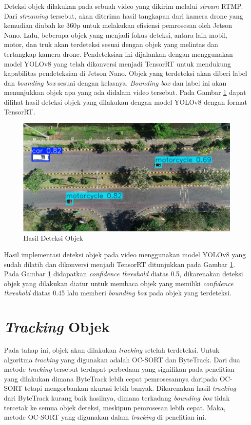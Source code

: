 Deteksi objek dilakukan pada sebuah video yang dikirim melalui \emph{stream} RTMP. Dari \emph{streaming} tersebut, akan diterima hasil tangkapan dari kamera drone yang kemudian diubah ke 360p untuk melakukan efisiensi pemrosesan oleh Jetson Nano. Lalu, beberapa objek yang menjadi fokus deteksi, antara lain mobil, motor, dan truk akan terdeteksi sesuai dengan objek yang melintas dan tertangkap kamera drone. Pendeteksian ini dijalankan dengan menggunakan model YOLOv8 yang telah dikonversi menjadi TensorRT untuk mendukung kapabilitas pendeteksian di Jetson Nano. Objek yang terdeteksi akan diberi label dan \emph{bounding box} sesuai dengan kelasnya. \emph{Bounding box} dan label ini akan menunjukkan objek apa yang ada didalam video tersebut. Pada Gambar \ref{fig:deteksi objek} dapat dilihat hasil deteksi objek yang dilakukan dengan model YOLOv8 dengan format TensorRT.

\begin{figure} [H] \centering
  \includegraphics[scale=0.3]{bab3/deteksiobjek.png}
  \caption{Hasil Deteksi Objek}
  \label{fig:deteksi objek}
\end{figure}
\vspace{-3ex}
Hasil implementasi deteksi objek pada video menggunakan model YOLOv8 yang sudah dilatih dan dikonversi menjadi TensorRT ditunjukkan pada Gambar \ref{fig:deteksi objek}. Pada Gambar \ref{fig:deteksi objek} didapatkan \emph{confidence threshold} diatas 0.5, dikarenakan deteksi objek yang dilakukan diatur untuk membaca objek yang memiliki \emph{confidence threshold} diatas 0.45 lalu memberi \emph{bounding box} pada objek yang terdeteksi.

\section{\emph{Tracking} Objek}
Pada tahap ini, objek akan dilakukan \emph{tracking} setelah terdeteksi. Untuk algoritma \emph{tracking} yang digunakan adalah OC-SORT dan ByteTrack. Dari dua metode \emph{tracking} tersebut terdapat perbedaan yang signifikan pada penelitian yang dilakukan dimana ByteTrack lebih cepat pemrosesannya daripada OC-SORT tetapi mengorbankan akurasi lebih banyak. Dikarenakan hasil \emph{tracking} dari ByteTrack kurang baik hasilnya, dimana terkadang \emph{bounding box} tidak tercetak ke semua objek deteksi, meskipun pemrosesan lebih cepat. Maka, metode OC-SORT yang digunakan dalam \emph{tracking} di penelitian ini.

